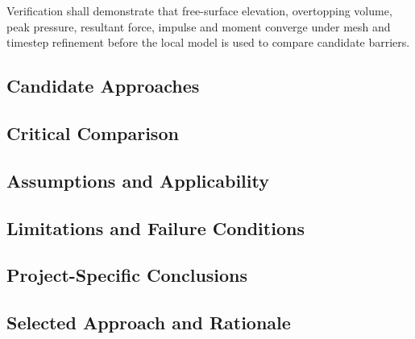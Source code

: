 
Verification shall demonstrate that free-surface elevation, overtopping
volume, peak pressure, resultant force, impulse and moment converge
under mesh and timestep refinement before the local model is used to
compare candidate barriers.

\subsection{Candidate Approaches}
\label{sec:res-num-err-candidate-approaches}


\subsection{Critical Comparison}
\label{sec:res-num-err-critical-comparison}


\subsection{Assumptions and Applicability}
\label{sec:res-num-err-assumptions}


\subsection{Limitations and Failure Conditions}
\label{sec:res-num-err-limitations}


\subsection{Project-Specific Conclusions}
\label{sec:res-num-err-conclusions}


\subsection{Selected Approach and Rationale}
\label{sec:res-num-err-selected-approach}

